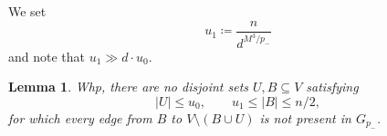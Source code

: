 \documentclass[10pt,a4paper]{article}
\newtheorem{lemma}[thm]{Lemma}
\begin{document}


We set
\begin{equation*}
 u_1\coloneqq \frac{n}{d^{M^3/p_-}}
\end{equation*}
and note that $u_1 \gg d\cdot u_0$.


\begin{lemma}\label{lem:no-small-separator}
Whp, there are no disjoint sets $U, B\subseteq V$ satisfying
\[
 |U|\le u_0, \qquad u_1\le|B|\le n/2,
\]
for which every edge from $B$ to $V\setminus(B\cup U)$ is not present in $G_{p_-}$.
\end{lemma}
\end{document}
